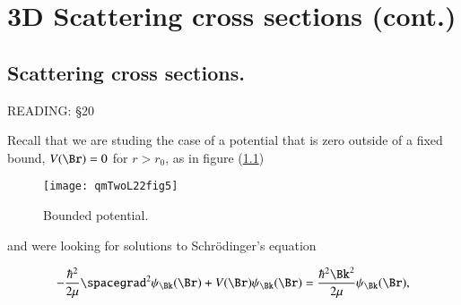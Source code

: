 %
%

%
%
%

\chapter{3D Scattering cross sections (cont.)}
\label{chap:qmTwoL24}
{}
\date{Dec 5, 2011}

\beginArtWithToc

%
%
\section{Scattering cross sections.}

READING: \S 20 \cite{desai2009quantum}

Recall that we are studing the case of a potential that is zero outside of a fixed bound, $V(\Br) = 0$ for $r > r_0$, as in figure (\ref{fig:qmTwoL24:qmTwoL22fig5})

\begin{figure}[htp]
   \centering
   \texttt{[image: qmTwoL22fig5]}
   \caption{Bounded potential.}\label{fig:qmTwoL24:qmTwoL22fig5}
\end{figure}

and were looking for solutions to Schr\"{o}dinger's equation 

\begin{equation}\label{eqn:qmTwoL24:10}
-\frac{\hbar^2}{2\mu} \spacegrad^2
\psi_\Bk(\Br)
+ V(\Br)
\psi_\Bk(\Br)
=
\frac{\hbar^2 \Bk^2}{2 \mu}
\psi_\Bk(\Br),
\end{equation}

